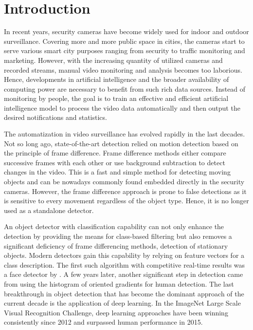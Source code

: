 \chapter*{Introduction}

In recent years, security cameras have become widely used for indoor and outdoor surveillance. Covering more and more public space in cities, the cameras start to serve various smart city purposes ranging from security to traffic monitoring and marketing. However, with the increasing quantity of utilized cameras and recorded streams, manual video monitoring and analysis becomes too laborious. Hence, developments in artificial intelligence and the broader availability of computing power are necessary to benefit from such rich data sources. Instead of monitoring by people, the goal is to train an effective and efficient artificial intelligence model to process the video data automatically and then output the desired notifications and statistics.

The automatization in video surveillance has evolved rapidly in the last decades. Not so long ago, state-of-the-art detection relied on motion detection based on the principle of frame difference. Frame difference methods either compare successive frames with each other or use background subtraction to detect changes in the video. This is a fast and simple method for detecting moving objects and can be nowadays commonly found embedded directly in the security cameras. However, the frame difference approach is prone to false detections as it is sensitive to every movement regardless of the object type. Hence, it is no longer used as a standalone detector.

An object detector with classification capability can not only enhance the detection by providing the means for class-based filtering but also removes a significant deficiency of frame differencing methods, detection of stationary objects.  Modern detectors gain this capability by relying on feature vectors for a class description. The first such algorithm with competitive real-time results was a face detector by \citeauthor{bib:viola}. A few years later, another significant step in detection came from \citeauthor{bib:hog} using the histogram of oriented gradients for human detection. The last breakthrough in object detection that has become the dominant approach of the current decade is the application of deep learning. In the ImageNet Large Scale Visual Recognition Challenge, deep learning approaches have been winning consistently since 2012 and surpassed human performance in 2015.


